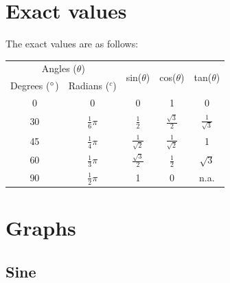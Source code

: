 \documentclass{book}
\begin{document}
\section{Exact values}
The exact values are as follows:
\begin{center}
	\begin{tabular}{c|c|c|c|c}
		\multicolumn{2}{c|}{Angles ($\theta$)}   & \multicolumn{1}{c|}{\multirow{2}{*}{sin($\theta$)}} & \multicolumn{1}{c|}{\multirow{2}{*}{cos($\theta$)}} & \multicolumn{1}{c}{\multirow{2}{*}{tan($\theta$)}}                         \\
		\multicolumn{1}{l|}{Degrees ($\degree$)} & Radians ($^c$)                                      & \multicolumn{1}{c|}{}                               & \multicolumn{1}{c|}{}                              & \multicolumn{1}{c}{}  \\
		\hline
		0                                        & \multicolumn{1}{c|}{0}                              & \multicolumn{1}{c|}{0}                              & \multicolumn{1}{c|}{1}                             & \multicolumn{1}{c}{0} \\
		\hline
		30                                       & $\frac{1}{6}\pi$                                    & $\frac{1}{2}$                                       & $\frac{\sqrt{3}}{2}$                               & $\frac{1}{\sqrt{3}}$  \\
		\hline
		45                                       & $\frac{1}{4}\pi$                                    & $\frac{1}{\sqrt{2}}$                                & $\frac{1}{\sqrt{2}}$                               & \multicolumn{1}{c}{1} \\
		\hline
		60                                       & $\frac{1}{3}\pi$                                    & $\frac{\sqrt{3}}{2}$                                & $\frac{1}{2}$                                      & $\sqrt{3}$            \\
		\hline
		90                                       & $\frac{1}{2}\pi$                                    & \multicolumn{1}{c|}{1}                              & \multicolumn{1}{c|}{0}                             & n.a.
	\end{tabular}
\end{center}

\section{Graphs}
\subsection{Sine}
\begin{center}
\end{center}
\end{document}
